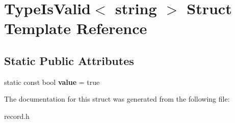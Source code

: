 \hypertarget{struct_type_is_valid_3_01string_01_4}{\section{Type\-Is\-Valid$<$ string $>$ Struct Template Reference}
\label{struct_type_is_valid_3_01string_01_4}
}
\subsection*{Static Public Attributes}
\begin{DoxyCompactItemize}
\item 
\hypertarget{struct_type_is_valid_3_01string_01_4_a8313dbae58c48e7b4e81e8fee5af320c}{static const bool {\bfseries value} = true}\label{struct_type_is_valid_3_01string_01_4_a8313dbae58c48e7b4e81e8fee5af320c}

\end{DoxyCompactItemize}


The documentation for this struct was generated from the following file\-:\begin{DoxyCompactItemize}
\item 
record.\-h\end{DoxyCompactItemize}
